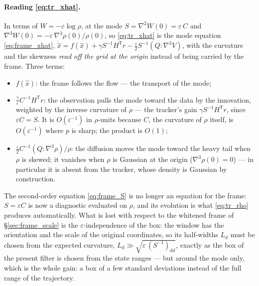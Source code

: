 \documentclass[11pt,a4paper]{article}
\newcommand{\T}{^{\mathsf T}}
\newcommand{\xh}{\hat{x}}
\newcommand{\eps}{\varepsilon}
\newcommand{\grad}{\nabla}
\theoremstyle{plain}
\theoremstyle{definition}
\theoremstyle{remark}
\begin{document}
\paragraph{Reading \eqref{eq:tr_xhat}.}
In terms of $W=-\eps\log\rho$, at the mode $S = \grad^2W(0) = \eps\,C$ and $\grad^3W(0) = -\eps\,\grad^3\rho(0)/\rho(0)$, so \eqref{eq:tr_xhat} is the mode equation \eqref{eq:frame_xhat}, $\dot{\xh} = f(\xh) + \gamma S^{-1}H\T r - \tfrac\eps2S^{-1}(Q\!:\!\grad^3V)$, with the curvature and the skewness \emph{read off the grid at the origin} instead of being carried by the frame. Three terms:
\begin{itemize}[leftmargin=1.5em]
  \item $f(\xh)$: the frame follows the flow --- the transport of the mode;
  \item $\tfrac\gamma\eps C^{-1}H\T r$: the observation pulls the mode toward the data by the innovation, weighted by the inverse curvature of $\rho$ --- the tracker's gain $\gamma S^{-1}H\T r$, since $\eps C=S$. It is $O(\eps^{-1})$ in $\rho$-units because $C$, the curvature of $\rho$ itself, is $O(\eps^{-1})$ where $p$ is sharp; the product is $O(1)$;
  \item $\tfrac\eps2C^{-1}(Q\!:\!\grad^3\rho)/\rho$: the diffusion moves the mode toward the heavy tail when $\rho$ is skewed; it vanishes when $\rho$ is Gaussian at the origin ($\grad^3\rho(0)=0$) --- in particular it is absent from the tracker, whose density is Gaussian by construction.
\end{itemize}
The second-order equation \eqref{eq:frame_S} is no longer an equation for the frame: $S=\eps C$ is now a diagnostic evaluated on $\rho$, and its evolution is what \eqref{eq:tr_rho} produces automatically. What is lost with respect to the whitened frame of \S\ref{sec:frame_scale} is the $\eps$-independence of the box: the window has the orientation and the scale of the original coordinates, so its half-widths $L_d$ must be chosen from the expected curvature, $L_d\gg\sqrt{\eps\,(S^{-1})_{dd}}$, exactly as the box of the present filter is chosen from the state ranges --- but around the mode only, which is the whole gain: a box of a few standard deviations instead of the full range of the trajectory.
\end{document}

